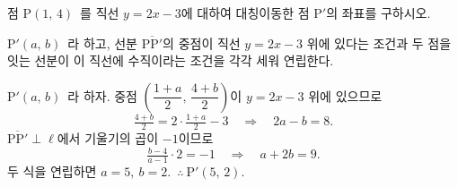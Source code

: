 \documentclass[10pt]{article}
\begin{document}
\dmchecktitle



\newpage


\begin{dmproblem}
점 $\mathrm{P}(1,\, 4)$\ 를 직선 $y = 2x - 3$에 대하여 대칭이동한 점 $\mathrm{P}'$의 좌표를 구하시오.
\end{dmproblem}

\begin{dmapproach}
$\mathrm{P}'(a,\, b)$\ 라 하고, 선분 $\overline{\mathrm{P}\mathrm{P}'}$의 중점이 직선 $y = 2x - 3$ 위에 있다는 조건과 두 점을 잇는 선분이 이 직선에 수직이라는 조건을 각각 세워 연립한다.
\end{dmapproach}

\begin{dmsolution}
$\mathrm{P}'(a,\, b)$\ 라 하자. 중점 $\left(\dfrac{1 + a}{2},\, \dfrac{4 + b}{2}\right)$이 $y = 2x - 3$ 위에 있으므로
\begin{equation*}
  \tfrac{4 + b}{2} = 2 \cdot \tfrac{1 + a}{2} - 3 \quad\Longrightarrow\quad 2a - b = 8.
\end{equation*}
$\overline{\mathrm{P}\mathrm{P}'} \perp \ell$에서 기울기의 곱이 $-1$이므로
\begin{equation*}
  \tfrac{b - 4}{a - 1} \cdot 2 = -1 \quad\Longrightarrow\quad a + 2b = 9.
\end{equation*}
두 식을 연립하면 $a = 5,\ b = 2$.\ $\therefore\ \mathrm{P}'(5,\, 2)$.
\end{dmsolution}

\dmchecktitle


\end{document}
